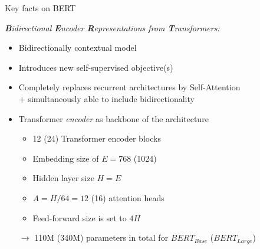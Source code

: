 \begin{vbframe}{Key facts on BERT \href{https://arxiv.org/pdf/1810.04805.pdf}{}}

\vfill

\textit{\textbf{B}idirectional \textbf{E}ncoder \textbf{R}epresentations from \textbf{T}ransformers:}
\begin{itemize}
		\item Bidirectionally contextual model
		\item Introduces new self-supervised objective(s)
		\item Completely replaces recurrent architectures by Self-Attention\\$+$ simultaneously able to include bidirectionality
\end{itemize}

	\begin{itemize}
		\item Transformer \textit{encoder} as backbone of the architecture
			\begin{itemize}
				\item 12 (24) Transformer encoder blocks
				\item Embedding size of $E = 768$ (1024)
				\item Hidden layer size $H = E$
				\item $A = H/64 = 12$ (16) attention heads
				\item Feed-forward size is set to $4H$
			\end{itemize}
			$\rightarrow$ 110M (340M) parameters in total for $BERT_{Base}$ ($BERT_{Large}$)
	\end{itemize}

\vfill

\end{vbframe}


